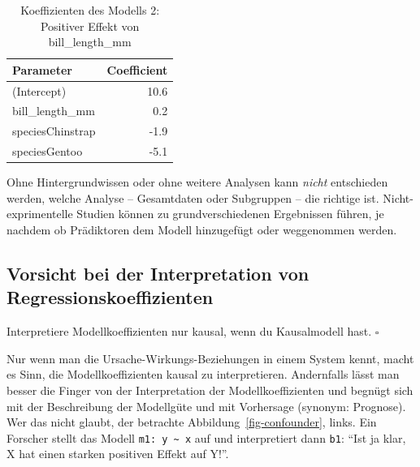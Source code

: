 \documentclass[
  letterpaper,
  twoside,
  open=any]{scrbook}
\theoremstyle{definition}
\theoremstyle{definition}
\theoremstyle{definition}
\theoremstyle{remark}
\begin{document}
\begin{longtable}[]{@{}lr@{}}

\caption{\label{tbl-peng-simpson2}Koeffizienten des Modells 2: Positiver
Effekt von bill\_length\_mm}

\tabularnewline

\toprule\noalign{}
Parameter & Coefficient \\
\midrule\noalign{}
\endhead
\bottomrule\noalign{}
\endlastfoot
(Intercept) & 10.6 \\
bill\_length\_mm & 0.2 \\
speciesChinstrap & -1.9 \\
speciesGentoo & -5.1 \\

\end{longtable}

Ohne Hintergrundwissen oder ohne weitere Analysen kann \emph{nicht}
entschieden werden, welche Analyse -- Gesamtdaten oder Subgruppen -- die
richtige ist. Nicht-exprimentelle Studien können zu grundverschiedenen
Ergebnissen führen, je nachdem ob Prädiktoren dem Modell hinzugefügt
oder weggenommen werden.

\subsection{Vorsicht bei der Interpretation von
Regressionskoeffizienten}\label{vorsicht-bei-der-interpretation-von-regressionskoeffizienten}

\begin{tcolorbox}[enhanced jigsaw, colbacktitle=quarto-callout-important-color!10!white, colframe=quarto-callout-important-color-frame, coltitle=black, arc=.35mm, breakable, opacitybacktitle=0.6, toprule=.15mm, colback=white, rightrule=.15mm, opacityback=0, toptitle=1mm, title=\textcolor{quarto-callout-important-color}{\faExclamation}\hspace{0.5em}{Wichtig}, titlerule=0mm, bottomtitle=1mm, bottomrule=.15mm, leftrule=.75mm, left=2mm]

Interpretiere Modellkoeffizienten nur kausal, wenn du Kausalmodell hast.
\(\square\)

\end{tcolorbox}

Nur wenn man die Ursache-Wirkungs-Beziehungen in einem System kennt,
macht es Sinn, die Modellkoeffizienten kausal zu interpretieren.
Andernfalls lässt man besser die Finger von der Interpretation der
Modellkoeffizienten und begnügt sich mit der Beschreibung der Modellgüte
und mit Vorhersage (synonym: Prognose). Wer das nicht glaubt, der
betrachte Abbildung~\ref{fig-confounder}, links. Ein Forscher stellt das
Modell \texttt{m1:\ y\ \textasciitilde{}\ x} auf und interpretiert dann
\texttt{b1}: \enquote{Ist ja klar, X hat einen starken positiven Effekt
auf Y!}.
\end{document}
